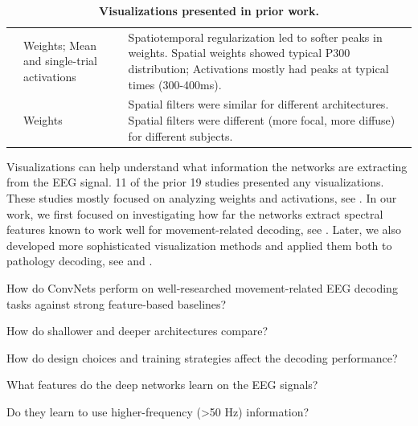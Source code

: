 \begin{table}[h!tb]
\begin{tabularx}{\textwidth}{p{}p{}p{}}
\cite{manor_convolutional_2015} & Weights; Mean and single-trial activations & Spatiotemporal regularization led to softer peaks in weights. Spatial weights showed typical P300 distribution; Activations mostly had peaks at typical times (300-400ms). \\
\cite{cecotti_convolutional_2011} & Weights & Spatial filters were similar for different architectures. Spatial filters were different (more focal, more diffuse) for different subjects. \\
        \bottomrule
    \end{tabularx}
    \caption[Visualizations presented in prior work.]{\textbf{Visualizations presented in prior work.}}  \label{prior-work-visualizations-table}
\end{table}


    Visualizations can help understand what information the networks are
extracting from the EEG signal. 11 of the prior 19 studies presented any
visualizations. These studies mostly focused on analyzing weights and
activations, see . In
our work, we first focused on investigating how far the networks extract
spectral features known to work well for movement-related decoding, see
. Later, we also developed
more sophisticated visualization methods and applied them both to
pathology decoding, see  and
.

\begin{openbox}
\item How do ConvNets perform on well-researched movement-related EEG decoding tasks against strong feature-based baselines?
\item How do shallower and deeper architectures compare?
\item How do design choices and training strategies affect the decoding performance?
\item What features do the deep networks learn on the EEG signals?
\item Do they learn to use higher-frequency (>50 Hz) information?
\end{openbox}
